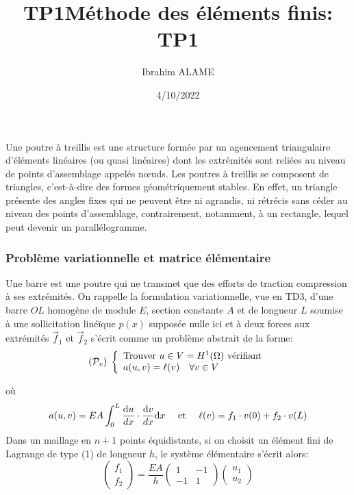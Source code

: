 \documentclass[11pt]{article}
\title{TP1}
\title{Méthode des éléments finis: TP1}
\author{Ibrahim ALAME}
\date{4/10/2022}
\def \de {{\rm d}}
\begin{document}
\maketitle
  
  
  Une poutre à treillis est une structure formée par un agencement triangulaire d'éléments linéaires (ou quasi linéaires) dont les extrémités sont reliées au niveau de points d'assemblage appelés nœuds. Les poutres à treillis se composent de triangles, c'est-à-dire des formes géométriquement stables. En effet, un triangle présente des angles fixes qui ne peuvent être ni agrandis, ni rétrécis sans céder au niveau des points d'assemblage, contrairement, notamment, à un rectangle, lequel peut devenir un parallélogramme.
\subsubsection*{Problème variationnelle et matrice élémentaire}
Une barre est une poutre qui ne transmet que des efforts de traction compression à ses extrémités. On rappelle la formulation variationnelle, vue en TD3,  d'une barre $OL$ homogène de module $E$, section constante $A$ et de longueur $L$ soumise à une sollicitation linéïque  $p(x)$ supposée nulle ici et à deux forces aux extrémités $\vec{f}_1$ et $\vec{f}_2$ s'écrit comme un problème abstrait de la forme:
\[
({\cal P}_v)\;\left\{
\begin{array}{l}
\mbox{Trouver } u\in V=H^1(\Omega) \mbox{ vérifiant}\\
a(u,v)=\ell(v)\quad \forall v\in V
\end{array}
\right.
\]

où \[ a(u,v)=\displaystyle EA\int_0^L\frac{\de u}{dx}\cdot \frac{\de v}{dx}\de x\quad \mbox{ et }\quad \ell(v)=f_1 \cdot v(0)+f_2 \cdot v(L)\]
Dans un maillage en $n+1$ points équidistants, si on choisit un élément fini de Lagrange de type (1) de longueur $h$, le système élémentaire s'écrit alors:
\[\left(\begin{array}{r} 
f_{1}\\f_{2}
\end{array}\right)=\frac{EA}{h}\left(\begin{array}{rr} 
1&-1\\-1&1
\end{array}\right) \left(\begin{array}{l} 
u_{1}\\u_{2}
\end{array}\right)
\]
\end{document}
